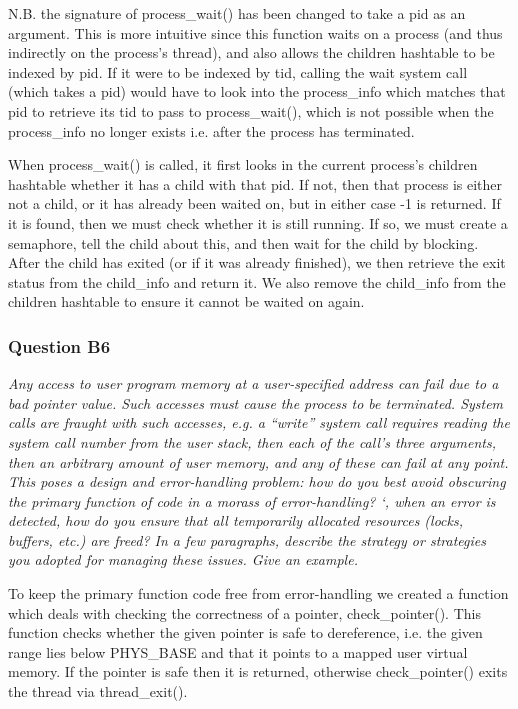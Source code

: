 N.B. the signature of process\_wait() has been changed to take a pid as an argument. This is more intuitive since this function waits on a process (and thus indirectly on the process's thread), and also allows the children hashtable to be indexed by pid. If it were to be indexed by tid, calling the wait system call (which takes a pid) would have to look into the process\_info which matches that pid to retrieve its tid to pass to process\_wait(), which is not possible when the process\_info no longer exists i.e. after the process has terminated.

When process\_wait() is called, it first looks in the current process's children hashtable whether it has a child with that pid. If not, then that process is either not a child, or it has already been waited on, but in either case -1 is returned. If it is found, then we must check whether it is still running. If so, we must create a semaphore, tell the child about this, and then wait for the child by blocking. After the child has exited (or if it was already finished), we then retrieve the exit status from the child\_info and return it. We also remove the child\_info from the children hashtable to ensure it cannot be waited on again.

\subsubsection*{Question B6} %
\textit{Any access to user program memory at a user-specified address can fail due to a bad pointer value.  Such accesses must cause the process to be terminated.  System calls are fraught with such accesses, e.g. a ``write'' system call requires reading the system call number from the user stack, then each of the call's three arguments, then an arbitrary amount of user memory, and any of these can fail at any point.  This poses a design and error-handling problem: how do you best avoid obscuring the primary function of code in a morass of error-handling?  `, when an error is detected, how do you ensure that all temporarily allocated resources (locks, buffers, etc.) are freed?  In a few paragraphs, describe the strategy or strategies you adopted for managing these issues.  Give an example.}

To keep the primary function code free from error-handling we created a function which deals with checking the correctness of a pointer, check\_pointer(). This function checks whether the given pointer is safe to dereference, i.e. the given range lies below PHYS\_BASE and that it points to a mapped user virtual memory. If the pointer is safe then it is returned, otherwise check\_pointer() exits the thread via thread\_exit().

